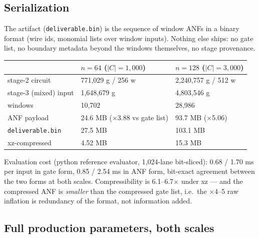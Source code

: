 \documentclass[11pt]{article}
\newcommand{\code}[1]{\texttt{#1}}
\begin{document}
\subsection{Serialization}

The artifact (\code{deliverable.bin}) is the sequence of window ANFs in a
binary format (wire ids, monomial lists over window inputs). Nothing else
ships: no gate list, no boundary metadata beyond the windows themselves, no
stage provenance.

\begin{table}[H]\centering
\begin{tabular}{lll}
\toprule
 & $n=64$ ($|C|=1{,}000$) & $n=128$ ($|C|=3{,}000$) \\
\midrule
stage-2 circuit & 771{,}029 g / 256 w & 2{,}240{,}757 g / 512 w \\
stage-3 (mixed) input & 1{,}648{,}679 g & 4{,}803{,}546 g \\
windows & 10{,}702 & 28{,}986 \\
ANF payload & 24.6 MB ($\times$3.88 vs gate list) & 93.7 MB ($\times$5.06) \\
\code{deliverable.bin} & 27.5 MB & 103.1 MB \\
xz-compressed & 4.52 MB & 15.3 MB \\
\bottomrule
\end{tabular}
\end{table}

Evaluation cost (python reference evaluator, 1{,}024-lane bit-sliced):
0.68 / 1.70 ms per input in gate form, 0.85 / 2.54 ms in ANF form, bit-exact
agreement between the two forms at both scales. Compressibility is
6.1--6.7$\times$ under xz --- and the compressed ANF is \emph{smaller} than
the compressed gate list, i.e.\ the $\times$4--5 raw inflation is redundancy
of the format, not information added.

\subsection{Full production parameters, both scales}
\end{document}
